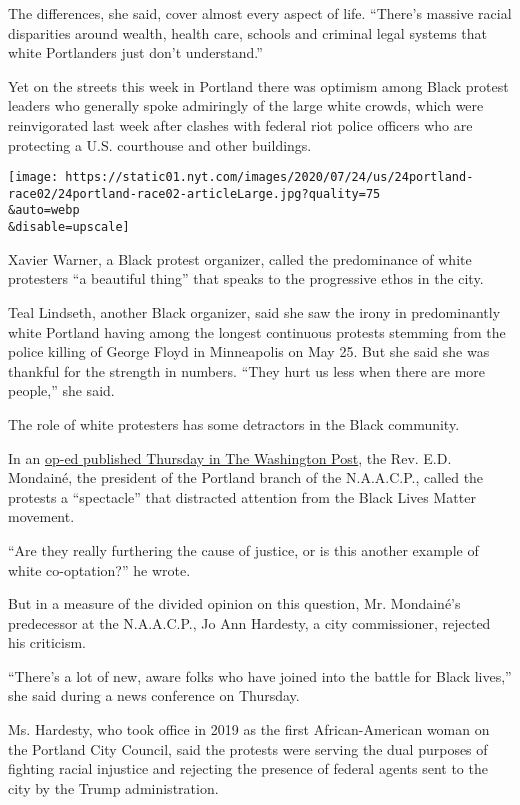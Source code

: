 The differences, she said, cover almost every aspect of life. ``There's
massive racial disparities around wealth, health care, schools and
criminal legal systems that white Portlanders just don't understand.''

Yet on the streets this week in Portland there was optimism among Black
protest leaders who generally spoke admiringly of the large white
crowds, which were reinvigorated last week after clashes with federal
riot police officers who are protecting a U.S. courthouse and other
buildings.

\texttt{[image: https://static01.nyt.com/images/2020/07/24/us/24portland-race02/24portland-race02-articleLarge.jpg?quality=75\\\&auto=webp\\\&disable=upscale]}

Xavier Warner, a Black protest organizer, called the predominance of
white protesters ``a beautiful thing'' that speaks to the progressive
ethos in the city.

Teal Lindseth, another Black organizer, said she saw the irony in
predominantly white Portland having among the longest continuous
protests stemming from the police killing of George Floyd in Minneapolis
on May 25. But she said she was thankful for the strength in numbers.
``They hurt us less when there are more people,'' she said.

The role of white protesters has some detractors in the Black community.

In an
\href{https://www.washingtonpost.com/opinions/2020/07/23/portlands-protests-were-supposed-be-about-black-lives-now-theyre-white-spectacle/}{op-ed
published Thursday in The Washington Post}, the Rev. E.D. Mondainé, the
president of the Portland branch of the N.A.A.C.P., called the protests
a ``spectacle'' that distracted attention from the Black Lives Matter
movement.

``Are they really furthering the cause of justice, or is this another
example of white co-optation?'' he wrote.

But in a measure of the divided opinion on this question, Mr. Mondainé's
predecessor at the N.A.A.C.P., Jo Ann Hardesty, a city commissioner,
rejected his criticism.

``There's a lot of new, aware folks who have joined into the battle for
Black lives,'' she said during a news conference on Thursday.

Ms. Hardesty, who took office in 2019 as the first African-American
woman on the Portland City Council, said the protests were serving the
dual purposes of fighting racial injustice and rejecting the presence of
federal agents sent to the city by the Trump administration.

